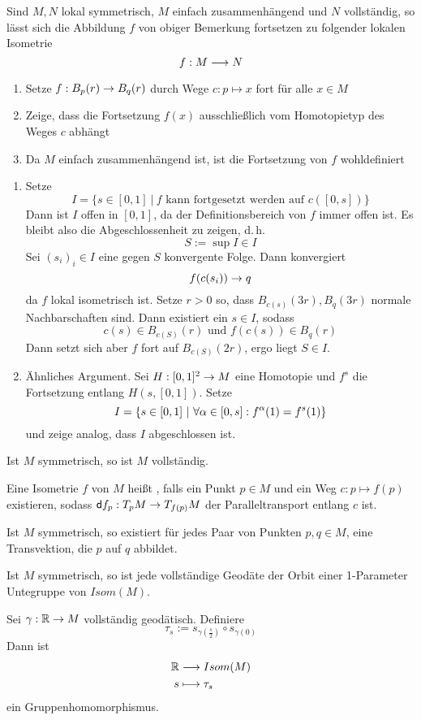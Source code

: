 \documentclass{book}
\renewcommand{\d}{\textsf{d}}
\begin{document}
\Lem{}
Sind $M, N$ lokal symmetrisch, $M$ einfach zusammenhängend und $N$ vollständig, so lässt sich die Abbildung $f$ von obiger Bemerkung fortsetzen zu folgender lokalen Isometrie
\[ f : M \overset{}{\longrightarrow} N \]
\begin{Beweis}{}
\begin{enumerate}[1.)]
\item Setze $f : B_p(r) \overset{}{\rightarrow} B_q(r) $ durch Wege $c : p \mapsto x$ fort für alle $x \in M$
\item Zeige, dass die Fortsetzung $f(x)$ ausschließlich vom Homotopietyp des Weges $c$ abhängt
\item Da $M$ einfach zusammenhängend ist, ist die Fortsetzung von $f$ wohldefiniert 
\end{enumerate}
\begin{enumerate}[\text{Ad} 1.)]
\item Setze
\[I = \{ s \in [0,1] ~|~ f \text{ kann fortgesetzt werden auf }c([0,s]) \}\]
Dann ist $I$ offen in $[0,1]$, da der Definitionsbereich von $f$ immer offen ist. Es bleibt also die Abgeschlossenheit zu zeigen, d.\,h.
\[ S:= \sup I \in I \]
Sei $(s_i)_i \in I$ eine gegen $S$ konvergente Folge. Dann konvergiert
\[ f(c(s_i)) \overset{}{\rightarrow} q \]
da $f$ lokal isometrisch ist. Setze $r > 0$ so, dass $B_{c(s)}(3r), B_{q}(3r)$ normale Nachbarschaften sind. Dann existiert ein $s \in I$, sodass
\[ c(s) \in B_{c(S)}(r) \text{ und } f(c(s)) \in B_q(r) \]
Dann setzt sich aber $f$ fort auf $B_{c(S)}(2r)$, ergo liegt $S \in I$.
\item Ähnliches Argument. Sei $H : [0,1]^2 \overset{}{\rightarrow} M$ eine Homotopie und $f^s$ die Fortsetzung entlang $H(s,[0,1])$. Setze
\[ I = \set{s \in [0,1]}{ \forall\alpha \in [0,s]: f^\alpha (1) = f^s(1) } \]
und zeige analog, dass $I$ abgeschlossen ist.
\end{enumerate}
\end{Beweis}

\Prop{}
Ist $M$ symmetrisch, so ist $M$ vollständig.

\Def{}
Eine Isometrie $f$ von $M$ heißt , falls ein Punkt $p \in M$ und ein Weg $c : p \mapsto f(p)$ existieren, sodass $\d f_p : T_pM \pfeil{} T_{f(p)}M$ der Paralleltransport entlang $c$ ist.

\Prop{}
Ist $M$ symmetrisch, so existiert für jedes Paar von Punkten $p,q \in M$, eine Transvektion, die $p$ auf $q$ abbildet.

\Kor{}
Ist $M$ symmetrisch, so ist jede vollständige Geodäte der Orbit einer 1-Parameter Untegruppe von $Isom(M)$.
\begin{Beweis}{}
Sei $\gamma : \mathbb{R} \overset{}{\rightarrow} M$ vollständig geodätisch. Definiere
\[ \tau_s := s_{\gamma(\frac{s}{2})} \circ s_{\gamma(0)} \]
Dann ist
\begin{align*}
\mathbb{R} &\overset{}{\longrightarrow} Isom(M)\\
s & \longmapsto \tau_s
\end{align*}
ein Gruppenhomomorphismus.
\end{Beweis}
\end{document}
